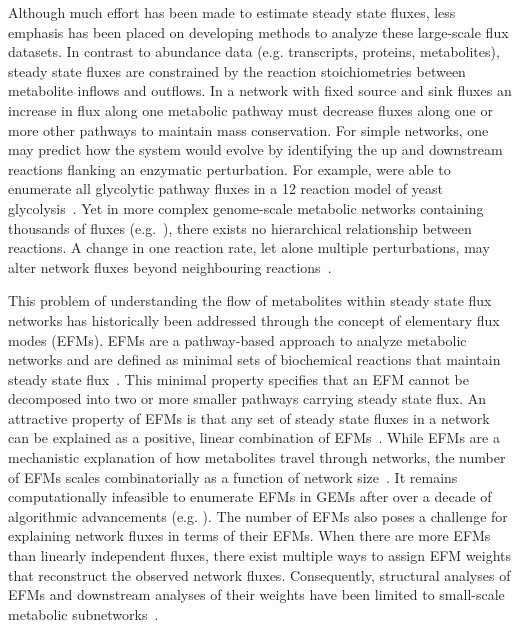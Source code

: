 \documentclass[12pt]{article}
\begin{document}
Although much effort has been made to estimate steady state fluxes, less
emphasis has been placed on developing methods to analyze these
large-scale flux datasets. In contrast to abundance data (e.g.
transcripts, proteins, metabolites), steady state fluxes are constrained
by the reaction stoichiometries between metabolite inflows and outflows.
In a network with fixed source and sink fluxes an increase in flux along
one metabolic pathway must decrease fluxes along one or more other
pathways to maintain mass conservation. For simple networks, one may
predict how the system would evolve by identifying the up and downstream
reactions flanking an enzymatic perturbation. For example,
\citeauthor{SchwartzJean-Marc2006Qema} were able to enumerate all
glycolytic pathway fluxes in a 12 reaction model of yeast
glycolysis~\citep{SchwartzJean-Marc2006Qema}. Yet in more complex genome-scale
metabolic networks containing thousands of fluxes
(e.g.~\cite{BrunkElizabeth2018Reat,RobinsonJonathanL2020Aaoh,WangHao2021Gmnr}),
there exists no hierarchical relationship between reactions. A change in one
reaction rate, let alone multiple perturbations, may alter network fluxes
beyond neighbouring reactions~\citep{NobileMarcoS2021Agsa}.

This problem of understanding the flow of metabolites within steady state
flux networks has historically been addressed through the concept of
elementary flux modes (EFMs). EFMs are a pathway-based approach to analyze
metabolic networks and are defined as minimal sets of biochemical
reactions that maintain steady state flux~\citep{SchusterStefan1994Oefm}.
This minimal property specifies that an EFM cannot be decomposed into two
or more smaller pathways carrying steady state flux. An attractive
property of EFMs is that any set of steady state fluxes in a network can
be explained as a positive, linear combination of
EFMs~\citep{SchusterStefan1999Doef}. While EFMs are a mechanistic
explanation of how metabolites travel through networks, the number of EFMs
scales combinatorially as a function of network
size~\citep{AcunaVicente2009Maci}. It remains computationally infeasible
to enumerate EFMs in GEMs after over a decade of algorithmic advancements
(e.g.
\citealt{GagneurJulien2004Coem,TerzerMarco2008Lcoe,BuchnerBiancaA2021EaPp}).
The number of EFMs also poses a challenge for explaining network fluxes in
terms of their EFMs. When there are more EFMs than linearly independent
fluxes, there exist multiple ways to assign EFM weights that reconstruct
the observed network fluxes. Consequently, structural analyses of EFMs and
downstream analyses of their weights have been limited to small-scale
metabolic
subnetworks~\citep{FakihIbrahim2023Dgmm,MpabanziLiliane2022Frca,ToyaYoshihiro2022Mpef,MatsudaFumio2011Esoy,SchwartzJean-Marc2006Qema}.
\end{document}

